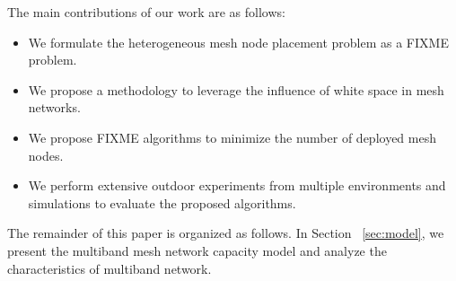% 

% 
The main contributions of our work are as follows:
\begin{itemize}
\item We formulate the heterogeneous mesh node placement problem as a FIXME problem.  

\item We propose a methodology to leverage the influence of white space in mesh networks.

\item We propose FIXME algorithms to minimize the number of deployed mesh nodes.

\item We perform extensive outdoor experiments from multiple environments and simulations to evaluate the proposed algorithms.


\end{itemize}



The remainder of this paper is organized as follows. In Section ~\ref{sec:model}, we present the multiband mesh network capacity model and analyze the characteristics of multiband network. 

